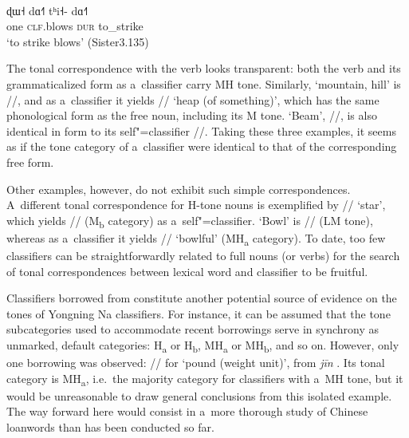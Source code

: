 \Hack{\newpage}

\begin{exe}
	\ex
	\label{ex:strikeablow}
	\\
	\gll ɖɯ˧	dɑ˧˥	tʰi˧-	dɑ˧˥\\
	one	\textsc{clf}.blows			\textsc{dur}		to\_strike\\
	\glt ‘to strike blows’ (Sister3.135)
\end{exe}

The tonal {correspondence} with the verb looks transparent: both the verb and its grammaticalized form as a~classifier carry MH tone. Similarly, ‘mountain, hill’ is //, and as a~classifier it yields //
‘heap (of something)’, which has the same phonological form as the free noun, including its M tone. ‘Beam’, //, is also identical in form to its
self"=classifier //. Taking these three examples, it seems as if the tone category of a~classifier
were identical to that of the corresponding free form.

\newpage 
Other examples, however, do not exhibit such simple correspondences. A~different tonal
{correspondence} for H-tone nouns is exemplified by // ‘star’, which yields // (M\textsubscript{b}
category) as a~self"=classifier. ‘Bowl’ is // (LM tone), whereas as a~classifier it
yields // ‘bowlful’ (MH\textsubscript{a} category). To date, too few classifiers can be straightforwardly related to full nouns (or verbs) for the search of tonal correspondences between lexical word and classifier to be fruitful. 

\label{sec:nohelpfromLoans}

Classifiers borrowed from  constitute another potential source of evidence on the tones of Yongning Na classifiers. For instance, it can be assumed that the tone subcategories used to accommodate recent borrowings serve in synchrony as unmarked, default categories: H\textsubscript{a} or H\textsubscript{b}, MH\textsubscript{a} or MH\textsubscript{b}, and so on. However, only
one borrowing was observed: // for ‘pound (weight unit)’, from  \textit{jīn} . Its tonal category
is MH\textsubscript{a}, i.e.\ the majority category for classifiers with a~MH tone, but it would be unreasonable to
draw general conclusions from this isolated example. The way forward here would consist in a~more thorough study of Chinese loanwords than has been conducted so far. 


